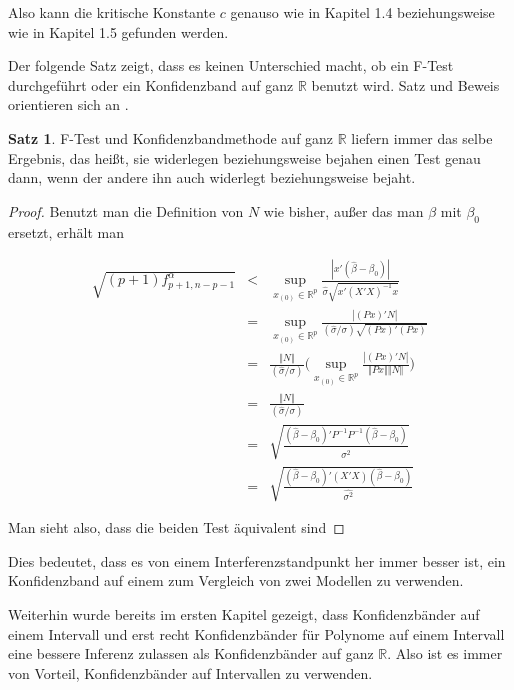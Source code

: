 \documentclass[12pt,a4paper]{article}
\theoremstyle{definition}
\theoremstyle{definition}
\newtheorem{Satz}[Definition]{Satz}
\theoremstyle{definition}
\theoremstyle{definition}
\begin{document}
Also kann die kritische Konstante $c$ genauso wie in Kapitel 1.4 beziehungsweise wie in Kapitel 1.5 gefunden werden.

Der folgende Satz zeigt, dass es keinen Unterschied macht, ob ein F-Test durchgeführt oder ein Konfidenzband auf ganz $\mathbb{R}$ benutzt wird. Satz und Beweis orientieren sich an \cite[67]{Liu64}.

\begin{Satz}
F-Test und Konfidenzbandmethode auf ganz $\mathbb{R}$ liefern immer das selbe Ergebnis, das heißt, sie widerlegen beziehungsweise bejahen einen Test genau dann, wenn der andere ihn auch widerlegt beziehungsweise bejaht.
\end{Satz}

\begin{proof}
Benutzt man die Definition von $N$ wie bisher, außer das man $\beta$ mit $\beta_0$ ersetzt, erhält man

\begin{eqnarray*}
\sqrt{(p+1) f^{\alpha}_{p+1,n-p-1}} &<& \sup_{x_{(0)} \in \mathbb{R}^p} \frac{|x'(\hat{\beta}-\beta_0) |}{\hat{\sigma} \sqrt{x'(X'X)^{-1}x}} \\
&=& \sup_{x_{(0)} \in \mathbb{R}^p} \frac{| (Px)' N |}{(\hat{\sigma}/\sigma) \sqrt{(Px)'(Px)}} \\
&=& \frac{\Vert N \Vert}{(\hat{\sigma}/\sigma)} \Big( \sup_{x_{(0)} \in \mathbb{R}^p} \frac{| (Px)' N |}{\Vert P x \Vert \Vert N \Vert} \Big) \\
&=& \frac{\Vert N \Vert}{(\hat{\sigma}/\sigma)} \\
&=& \sqrt{ \frac{(\hat{\beta}-\beta_0)' P^{-1} P^{-1} (\hat{\beta}-\beta_0)}{\widehat{\sigma^2}} } \\
&=& \sqrt{\frac{(\hat{\beta}-\beta_0)' (X'X) (\hat{\beta}-\beta_0)}{\widehat{\sigma^2}}}
\end{eqnarray*}

Man sieht also, dass die beiden Test äquivalent sind
\end{proof}

Dies bedeutet, dass es von einem Interferenzstandpunkt her immer besser ist, ein Konfidenzband auf einem  zum Vergleich von zwei Modellen zu verwenden.

Weiterhin wurde bereits im ersten Kapitel gezeigt, dass Konfidenzbänder auf einem Intervall und erst recht Konfidenzbänder für Polynome auf einem Intervall eine bessere Inferenz zulassen als Konfidenzbänder auf ganz $\mathbb{R}$. Also ist es immer von Vorteil, Konfidenzbänder auf Intervallen zu verwenden.
\end{document}
